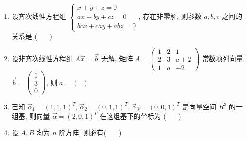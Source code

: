 \begin{enumerate}
	
	\item 设齐次线性方程组 $\begin{cases} x+y+z=0 \\ ax+by+cz=0 \\ bcx+cay+abz=0 \end{cases}$, 存在非零解, 则参数 $a, b, c$ 之间的关系是 ( \ \ \ )
	\vspace{0.5em}
	
	\item 设非齐次线性方程组 $A\vec{x}=\vec{b}$ 无解, 矩阵 $A = \begin{pmatrix} 1 & 2 & 1 \\ 2 & 3 & a+2 \\ 1 & a & -2 \end{pmatrix}$ 常数项列向量 $\vec{b} = \begin{pmatrix} 1 \\ 3 \\ 0 \end{pmatrix}$, 则 $a= ( \ \ \ )$
	\vspace{0.5em}
	
	\item 已知 $\vec{\alpha}_1 = (1, 1, 1)^T$, $\vec{\alpha}_2 = (0, 1, 1)^T$, $\vec{\alpha}_3 = (0, 0, 1)^T$ 是向量空间 $R^3$ 的一组基, 则向量 $\vec{\alpha} = (2, 0, 1)^T$ 在这组基下的坐标为 ( \ \ \ )
	\vspace{0.5em}
	
	\item 设 $A, B$ 均为 $n$ 阶方阵, 则必有( \ \ \ )
	\vspace{0.5em}
	

\end{enumerate}
